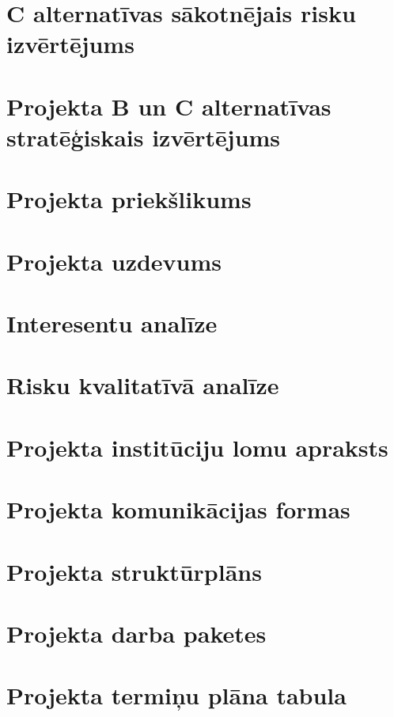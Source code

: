 \section{C alternatīvas sākotnējais risku izvērtējums}
	\label{app:C_sakotnejie_riski}
    \clearpage
\section{Projekta B un C alternatīvas stratēģiskais izvērtējums}
	\label{app:B_C_strategiskais_vertejums}
    \clearpage
\section{Projekta priekšlikums}
	\label{app:Projekta_priekslikums}
    \clearpage
\section{Projekta uzdevums}
	\label{app:Projekta_uzdevums}
    \clearpage
\section{Interesentu analīze}
	\label{app:Projekta_interesentu_analize}
    \clearpage
\section{Risku kvalitatīvā analīze}
	\label{app:Projekta_risku_analize}
    \clearpage
\section{Projekta institūciju lomu apraksts}
	\label{app:Projekta_instituciju_apraksts}
    \clearpage
\section{Projekta komunikācijas formas}
	\label{app:Projekta_komunikacijas_formas}
    \clearpage
\section{Projekta struktūrplāns}
	\label{app:Projekta_strukturplans}
    \clearpage
\section{Projekta darba paketes}
	\label{app:Projekta_darba_paketes}
    \clearpage
\section{Projekta termiņu plāna tabula}
	\label{app:Projekta_terminu_plans}
    \clearpage
